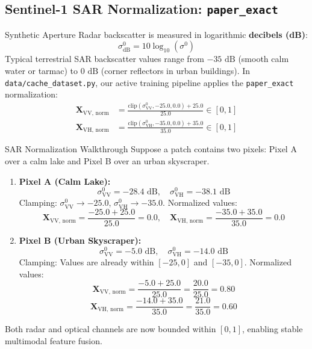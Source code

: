 \subsection{Sentinel-1 SAR Normalization: \texttt{paper\_exact}}
Synthetic Aperture Radar backscatter is measured in logarithmic \textbf{decibels (dB)}:
\begin{equation}
\sigma^0_{\text{dB}} = 10 \log_{10}(\sigma^0)
\end{equation}
Typical terrestrial SAR backscatter values range from $-35\text{ dB}$ (smooth calm water or tarmac) to $0\text{ dB}$ (corner reflectors in urban buildings). In \texttt{data/cache\_dataset.py}, our active training pipeline applies the \texttt{paper\_exact} normalization:
\begin{align}
\mathbf{X}_{\text{VV, norm}} &= \frac{\text{clip}(\sigma^0_{\text{VV}}, -25.0, 0.0) + 25.0}{25.0} \in [0, 1] \\
\mathbf{X}_{\text{VH, norm}} &= \frac{\text{clip}(\sigma^0_{\text{VH}}, -35.0, 0.0) + 35.0}{35.0} \in [0, 1]
\end{align}

\begin{mathbox}{SAR Normalization Walkthrough}
Suppose a patch contains two pixels: Pixel A over a calm lake and Pixel B over an urban skyscraper.
\begin{enumerate}
    \item \textbf{Pixel A (Calm Lake):}
    \[
    \sigma^0_{\text{VV}} = -28.4\text{ dB}, \quad \sigma^0_{\text{VH}} = -38.1\text{ dB}
    \]
    Clamping: $\sigma^0_{\text{VV}} \to -25.0$, $\sigma^0_{\text{VH}} \to -35.0$.
    Normalized values:
    \[
    \mathbf{X}_{\text{VV, norm}} = \frac{-25.0 + 25.0}{25.0} = \mathbf{0.0}, \quad \mathbf{X}_{\text{VH, norm}} = \frac{-35.0 + 35.0}{35.0} = \mathbf{0.0}
    \]
    \item \textbf{Pixel B (Urban Skyscraper):}
    \[
    \sigma^0_{\text{VV}} = -5.0\text{ dB}, \quad \sigma^0_{\text{VH}} = -14.0\text{ dB}
    \]
    Clamping: Values are already within $[-25, 0]$ and $[-35, 0]$.
    Normalized values:
    \[
    \mathbf{X}_{\text{VV, norm}} = \frac{-5.0 + 25.0}{25.0} = \frac{20.0}{25.0} = \mathbf{0.80}
    \]
    \[
    \mathbf{X}_{\text{VH, norm}} = \frac{-14.0 + 35.0}{35.0} = \frac{21.0}{35.0} = \mathbf{0.60}
    \]
\end{enumerate}
Both radar and optical channels are now bounded within $[0, 1]$, enabling stable multimodal feature fusion.
\end{mathbox}

